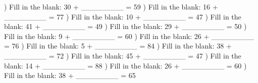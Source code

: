 \documentclass{article}%
\begin{document}
\newline%
\newline%
) Fill in the blank: 30 + \_\_\_\_\_\_\_\_ = 59%
\newline%
\newline%
) Fill in the blank: 16 + \_\_\_\_\_\_\_\_ = 77%
\newline%
\newline%
) Fill in the blank: 10 + \_\_\_\_\_\_\_\_ = 47%
\newline%
\newline%
) Fill in the blank: 41 + \_\_\_\_\_\_\_\_ = 49%
\newline%
\newline%
) Fill in the blank: 29 + \_\_\_\_\_\_\_\_ = 50%
\newline%
\newline%
) Fill in the blank: 9 + \_\_\_\_\_\_\_\_ = 60%
\newline%
\newline%
) Fill in the blank: 26 + \_\_\_\_\_\_\_\_ = 76%
\newline%
\newline%
) Fill in the blank: 5 + \_\_\_\_\_\_\_\_ = 84%
\newline%
\newline%
) Fill in the blank: 38 + \_\_\_\_\_\_\_\_ = 72%
\newline%
\newline%
) Fill in the blank: 45 + \_\_\_\_\_\_\_\_ = 47%
\newline%
\newline%
) Fill in the blank: 14 + \_\_\_\_\_\_\_\_ = 88%
\newline%
\newline%
) Fill in the blank: 26 + \_\_\_\_\_\_\_\_ = 60%
\newline%
\newline%
) Fill in the blank: 38 + \_\_\_\_\_\_\_\_ = 65%
\end{document}
